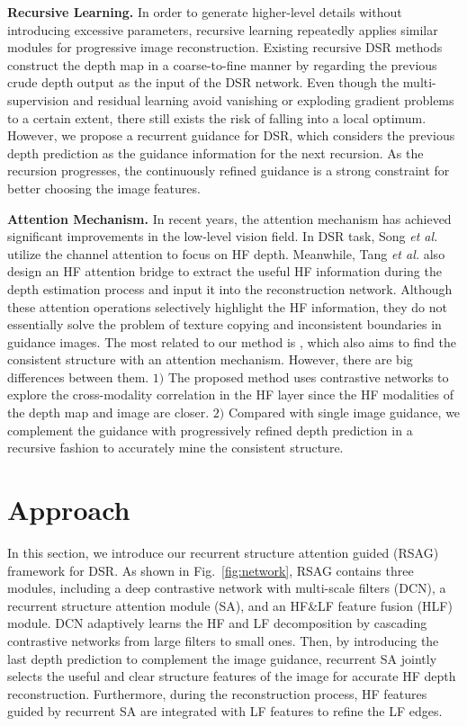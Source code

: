 \documentclass[letterpaper]{article} %
\begin{document}
\textbf{Recursive Learning.}
In order to generate higher-level details without introducing excessive parameters, recursive learning repeatedly applies similar modules for progressive image reconstruction. Existing recursive DSR methods \cite{wen2019deep,yang2019depth,song2020channel} construct the depth map in a coarse-to-fine manner by regarding the previous crude depth output as the input of the DSR network. Even though the multi-supervision and residual learning avoid vanishing or exploding gradient problems to a certain extent, there still exists the risk of falling into a local optimum.
However, we propose a recurrent guidance for DSR, which considers the previous depth prediction as the guidance information for the next recursion. As the recursion progresses, the continuously refined guidance is a strong constraint for better choosing the image features.

\textbf{Attention Mechanism.}
In recent years, the attention mechanism \cite{zhang2019self, guo2020closed, wang2021regularizing} has achieved significant improvements in the low-level vision field.
 In DSR task, Song \textit{et al.} \cite{song2020channel} utilize the channel attention to focus on HF depth. Meanwhile, Tang \textit{et al.} \cite{tang2021bridgenet} also design an HF attention bridge to extract the useful HF information during the depth estimation process and input it into the reconstruction network.
Although these attention operations selectively highlight the HF information, they do not essentially solve the problem of texture copying and inconsistent boundaries in guidance images. The most related to our method is \cite{zhong2021high}, which also aims to find the consistent structure with an attention mechanism. However, there are big differences between them. $1)$ The proposed method uses contrastive networks to explore the cross-modality  correlation in the HF layer since the HF modalities of the depth map and image are closer.
$2)$ Compared with single image guidance, we complement the guidance with progressively refined depth prediction in a recursive fashion to accurately mine the consistent structure.


\section{Approach}
In this section, we introduce our recurrent structure attention guided (RSAG) framework for DSR. As shown in Fig.~\ref{fig:network}, RSAG contains three modules, including a deep contrastive network with multi-scale filters (DCN), a recurrent structure attention module (SA), and an HF\&LF feature fusion (HLF) module. DCN adaptively learns the HF and LF decomposition by cascading contrastive networks from large filters to small ones.
Then, by introducing the last depth prediction to complement the image guidance, recurrent SA jointly selects the useful and clear structure features of the image for accurate HF depth reconstruction. Furthermore, during the reconstruction process, HF features guided by recurrent SA are integrated with LF features to refine the LF edges.
\end{document}
